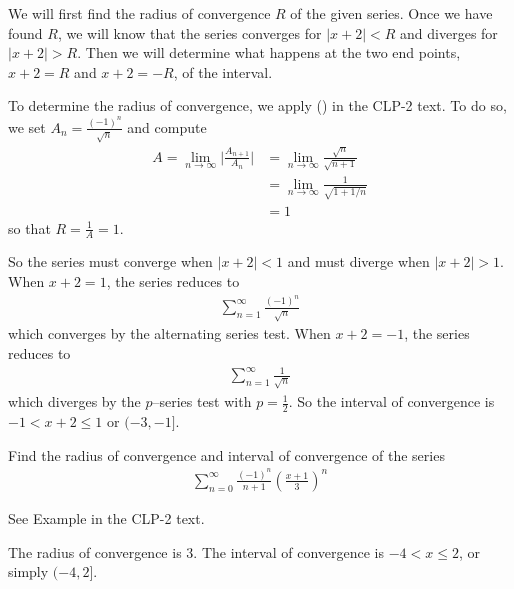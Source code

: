 \begin{solution}
We will first find the radius of convergence $R$ of the given series. Once we have found $R$, we will know 
that the series converges for $|x+2|<R$ and diverges for $|x+2|>R$. Then we will determine what 
happens at the two end points, $x+2=R$ and $x+2=-R$, of the interval.

To determine the radius of convergence, we apply () in the CLP-2 text. To do so, we set $A_n= \frac{(-1)^n}{\sqrt{n}}$ and compute
\begin{align*}
A = \lim_{n\to\infty} \bigg| \frac{A_{n+1}}{A_n}\bigg|
&=\lim_{n\rightarrow\infty} \frac{\sqrt{n}}{\sqrt{n+1}} \\
&=\lim_{n\rightarrow\infty} \frac{1}{\sqrt{1+1/n}} \\
&=1
\end{align*}
so that $R=\frac{1}{A}=1$.
 
So the series must converge when $|x+2|<1$ and must diverge when $|x+2|>1$.
When $x+2=1$, the series reduces to
\begin{align*}
\sum_{n=1}^\infty \frac{(-1)^n}{\sqrt{n}}
\end{align*}
which converges by the alternating series test.
When $x+2=-1$, the series reduces to
\begin{align*}
\sum_{n=1}^\infty \frac{1}{\sqrt{n}}
\end{align*}
which diverges by the $p$--series test with $p=\frac{1}{2}$.
So the interval of convergence is $-1<x+2\le 1$ or $(-3,-1]$.

\end{solution}

\begin{Mquestion}[2016Q5]
Find the radius of convergence and interval of convergence of the series
\begin{align*}
\sum_{n=0}^{\infty} \frac{(-1)^n}{n+1} \left(\frac{x+1}{3}\right)^n
\end{align*}
\end{Mquestion}

\begin{hint}
See Example  in the
CLP-2 text.
\end{hint}

\begin{answer}
The radius of convergence is $3$.
The interval of convergence is $-4<x\le2$, or simply $(-4,2]$.
\end{answer}

